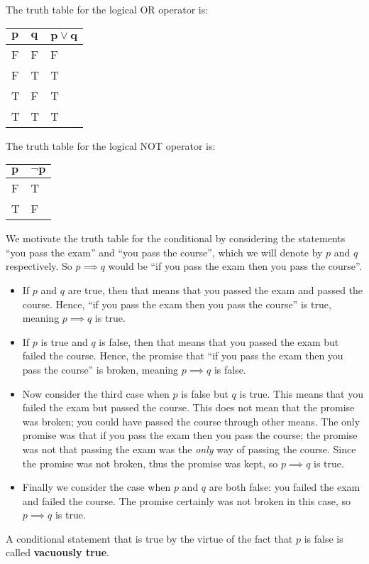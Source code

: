 The truth table for the logical OR operator is:
\begin{table}[h]
    \centering
    \begin{tabular}{|l|l||l|}
        \hline
        $\boldsymbol{p}$ & $\boldsymbol{q}$ & $\boldsymbol{p \lor q}$ \\ \hline
        F   & F   & F         \\ \hline
        F   & T   & T         \\ \hline
        T   & F   & T         \\ \hline
        T   & T   & T         \\ \hline
    \end{tabular}
\end{table}

The truth table for the logical NOT operator is:
\begin{table}[h]
    \centering
    \begin{tabular}{|l||l|}
        \hline
        $\boldsymbol{p}$ & $\boldsymbol{\lnot p}$ \\ \hline
        F   & T         \\ \hline
        T   & F         \\ \hline
    \end{tabular}
\end{table}

We motivate the truth table for the conditional by considering the statements ``you pass the exam'' and ``you pass the course'', which we will denote by $p$ and $q$ respectively. So $p \implies q$ would be ``if you pass the exam then you pass the course''.
\begin{itemize}
    \item If $p$ and $q$ are true, then that means that you passed the exam and passed the course. Hence, ``if you pass the exam then you pass the course'' is true, meaning $p \implies q$ is true.
    \item If $p$ is true and $q$ is false, then that means that you passed the exam but failed the course. Hence, the promise that ``if you pass the exam then you pass the course'' is broken, meaning $p \implies q$ is false.
    \item Now consider the third case when $p$ is false but $q$ is true. This means that you failed the exam but passed the course. This does not mean that the promise was broken; you could have passed the course through other means. The only promise was that if you pass the exam then you pass the course; the promise was not that passing the exam was the \textit{only} way of passing the course. Since the promise was not broken, thus the promise was kept, so $p \implies q$ is true.
    \item Finally we consider the case when $p$ and $q$ are both false: you failed the exam and failed the course. The promise certainly was not broken in this case, so $p \implies q$ is true.
\end{itemize}
\begin{remark}
    A conditional statement that is true by the virtue of the fact that $p$ is false is called \textbf{vacuously true}.
\end{remark}


